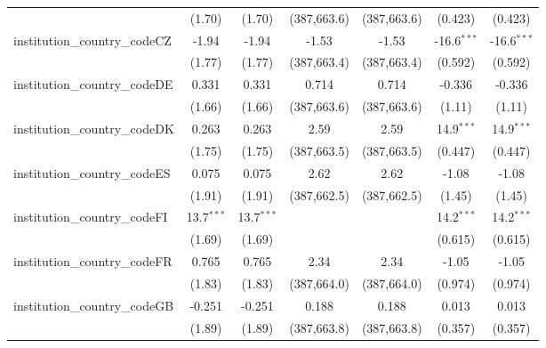 \begin{tabular}{lcccccc}
                                         & (1.70)        & (1.70)        & (387,663.6)   & (387,663.6)   & (0.423)       & (0.423)\\   
   institution\_country\_codeCZ          & -1.94         & -1.94         & -1.53         & -1.53         & -16.6$^{***}$ & -16.6$^{***}$\\   
                                         & (1.77)        & (1.77)        & (387,663.4)   & (387,663.4)   & (0.592)       & (0.592)\\   
   institution\_country\_codeDE          & 0.331         & 0.331         & 0.714         & 0.714         & -0.336        & -0.336\\   
                                         & (1.66)        & (1.66)        & (387,663.6)   & (387,663.6)   & (1.11)        & (1.11)\\   
   institution\_country\_codeDK          & 0.263         & 0.263         & 2.59          & 2.59          & 14.9$^{***}$  & 14.9$^{***}$\\   
                                         & (1.75)        & (1.75)        & (387,663.5)   & (387,663.5)   & (0.447)       & (0.447)\\   
   institution\_country\_codeES          & 0.075         & 0.075         & 2.62          & 2.62          & -1.08         & -1.08\\   
                                         & (1.91)        & (1.91)        & (387,662.5)   & (387,662.5)   & (1.45)        & (1.45)\\   
   institution\_country\_codeFI          & 13.7$^{***}$  & 13.7$^{***}$  &               &               & 14.2$^{***}$  & 14.2$^{***}$\\   
                                         & (1.69)        & (1.69)        &               &               & (0.615)       & (0.615)\\   
   institution\_country\_codeFR          & 0.765         & 0.765         & 2.34          & 2.34          & -1.05         & -1.05\\   
                                         & (1.83)        & (1.83)        & (387,664.0)   & (387,664.0)   & (0.974)       & (0.974)\\   
   institution\_country\_codeGB          & -0.251        & -0.251        & 0.188         & 0.188         & 0.013         & 0.013\\   
                                         & (1.89)        & (1.89)        & (387,663.8)   & (387,663.8)   & (0.357)       & (0.357)\\   

\end{tabular}
